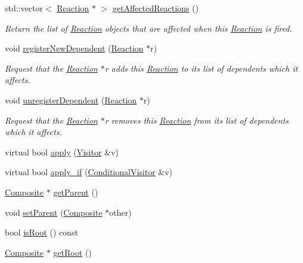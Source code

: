 \begin{DoxyCompactItemize}
std\-::vector$<$ \hyperlink{classchem_1_1Reaction}{Reaction} $\ast$ $>$ \hyperlink{classchem_1_1Reaction_aff0f07aebff09a5f15f2bd6d17686016}{get\-Affected\-Reactions} ()
\begin{DoxyCompactList}\small\item\em Return the list of \hyperlink{classchem_1_1Reaction}{Reaction} objects that are affected when this \hyperlink{classchem_1_1Reaction}{Reaction} is fired. \end{DoxyCompactList}\item 
void \hyperlink{classchem_1_1Reaction_a9971edbe11bb8c6b3148cbee3a449872}{register\-New\-Dependent} (\hyperlink{classchem_1_1Reaction}{Reaction} $\ast$r)
\begin{DoxyCompactList}\small\item\em Request that the \hyperlink{classchem_1_1Reaction}{Reaction} $\ast$r adds this \hyperlink{classchem_1_1Reaction}{Reaction} to its list of dependents which it affects. \end{DoxyCompactList}\item 
void \hyperlink{classchem_1_1Reaction_ab31fe2ac310f8d17b1af649bcb70e050}{unregister\-Dependent} (\hyperlink{classchem_1_1Reaction}{Reaction} $\ast$r)
\begin{DoxyCompactList}\small\item\em Request that the \hyperlink{classchem_1_1Reaction}{Reaction} $\ast$r removes this \hyperlink{classchem_1_1Reaction}{Reaction} from its list of dependents which it affects. \end{DoxyCompactList}\item 
virtual bool \hyperlink{classchem_1_1Component_ae9efcf2fb203ab7514f81f04d7e4dec2}{apply} (\hyperlink{classchem_1_1Visitor}{Visitor} \&v)
\item 
virtual bool \hyperlink{classchem_1_1Component_ac40e9d75a554324ba1d007a2d5234a38}{apply\-\_\-if} (\hyperlink{classchem_1_1ConditionalVisitor}{Conditional\-Visitor} \&v)
\item 
\hyperlink{classchem_1_1Composite}{Composite} $\ast$ \hyperlink{classchem_1_1Component_a32812270ee52f07ceae2194c56864fd6}{get\-Parent} ()
\item 
void \hyperlink{classchem_1_1Component_a1f4e4d1566f1d3026f1e2a14fa3dffd9}{set\-Parent} (\hyperlink{classchem_1_1Composite}{Composite} $\ast$other)
\item 
bool \hyperlink{classchem_1_1Component_a75cd13a0d884f82fcddd574de33fbfe6}{is\-Root} () const 
\item 
\hyperlink{classchem_1_1Composite}{Composite} $\ast$ \hyperlink{classchem_1_1Component_a7f1166f8fb4c9526cd1794ec3c2714f5}{get\-Root} ()

\end{DoxyCompactItemize}
